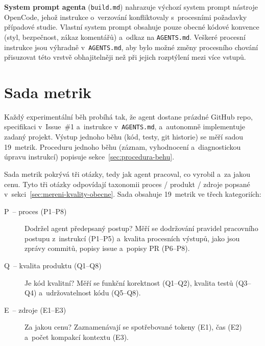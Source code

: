 \textbf{System prompt agenta} (\texttt{build.md}) nahrazuje výchozí
system prompt nástroje OpenCode, jehož instrukce o~verzování
konfliktovaly s~procesními požadavky případové studie. Vlastní system prompt
obsahuje pouze obecné kódové konvence (styl, bezpečnost, zákaz
komentářů) a~odkaz na \texttt{AGENTS.md}. Veškeré procesní instrukce
jsou výhradně v~\texttt{AGENTS.md}, aby bylo možné změny procesního
chování přisuzovat této vrstvě obhajitelněji než při jejich
rozptýlení mezi více vstupů.


\section{Sada metrik}
\label{sec:sada-metrik}

Každý experimentální běh probíhá tak, že agent dostane prázdné
GitHub repo, specifikaci v~Issue~\#1 a~instrukce v~\texttt{AGENTS.md},
a~autonomně implementuje zadaný projekt. Výstup jednoho běhu (kód,
testy, git historie) se měří sadou 19~metrik. Proceduru jednoho běhu
(záznam, vyhodnocení a~diagnostickou úpravu instrukcí) popisuje
sekce~\ref{sec:procedura-behu}.

Sada metrik pokrývá tři otázky, tedy jak agent pracoval, co vyrobil
a~za jakou cenu. Tyto tři otázky odpovídají taxonomii proces /
produkt / zdroje popsané v~sekci~\ref{sec:mereni-kvality-obecne}.
Sada obsahuje 19~metrik ve třech kategoriích:

\begin{description}
    \item[P~-- proces (P1--P8)] Dodržel agent předepsaný postup?
          Měří se dodržování pravidel pracovního postupu z~instrukcí
          (\acs{P1}--\acs{P5}) a~kvalita procesních výstupů, jako jsou
          zprávy commitů, popisy issue a~popisy PR (\acs{P6}--\acs{P8}).
    \item[Q~-- kvalita produktu (Q1--Q8)] Je kód kvalitní?
          Měří se funkční korektnost (\acs{Q1}--\acs{Q2}), kvalita testů
          (\acs{Q3}--\acs{Q4}) a~udržovatelnost kódu (\acs{Q5}--\acs{Q8}).
    \item[E~-- zdroje (E1--E3)] Za jakou cenu?
          Zaznamenávají se spotřebované tokeny (\acs{E1}), čas (\acs{E2})
          a~počet kompakcí kontextu (\acs{E3}).
\end{description}

